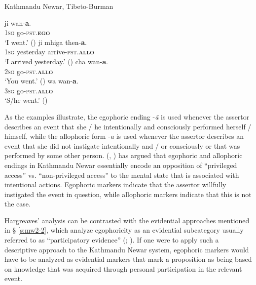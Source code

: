 \documentclass[output=paper]{langsci/langscibook}
\begin{document}
\begin{exe}
	\ex Kathmandu Newar, Tibeto-Burman\label{ex:mw1}
	\begin{xlist}
		\ex \label{ex:mw1a}
		\gll ji	wan-\textbf{ā}.\\
		1\textsc{sg} go-\textsc{pst}.\textbf{\textsc{ego}}\\
		\trans ‘I went.’ (\citealt[12]{Hargreaves2005})
		\ex \label{ex:mw1b}
		\gll ji	mhiga then-\textbf{a}.\\
		1\textsc{sg} yesterday arrive-\textsc{pst}.\textbf{\textsc{allo}}\\
		\trans ‘I arrived yesterday.’ (\citealt[13]{Hargreaves2005})
		\ex \label{ex:mw1c}
		\gll cha	 wan-\textbf{a}.\\
		2\textsc{sg} go-\textsc{pst}.\textbf{\textsc{allo}}\\
		\trans ‘You went.’ (\citealt[12]{Hargreaves2005})
		\ex \label{ex:mw1d}
		\gll wa	wan-\textbf{a}.\\
		3\textsc{sg} go-\textsc{pst}.\textbf{\textsc{allo}}\\
		\trans ‘S/he went.’ (\citealt[12]{Hargreaves2005})
	\end{xlist}
\end{exe}

As the examples illustrate, the egophoric ending -\textit{ā} is used whenever the assertor describes an event that she / he intentionally and consciously performed herself / himself, while the allophoric form -\textit{a} is used whenever the assertor describes an event that she did not instigate intentionally and / or consciously or that was performed by some other person. \citeauthor{Hargreaves1991} (\citeyear{Hargreaves1991}, \citeyear{Hargreaves2005}) has argued that egophoric and allophoric endings in Kathmandu Newar essentially encode an opposition of “privileged access” vs. “non-privileged access” to the mental state that is associated with intentional actions. Egophoric markers indicate that the assertor willfully instigated the event in question, while allophoric markers indicate that this is not the case.

Hargreaves’ analysis can be contrasted with the evidential approaches mentioned in § \ref{s:mw2-2}, which analyze egophoricity as an evidential subcategory usually referred to as “participatory evidence” (\citealt{Plungian2010}; \citealt{SanRoqueLoughnane2012}). If one were to apply such a descriptive approach to the Kathmandu Newar system, egophoric markers would have to be analyzed as evidential markers that mark a proposition as being based on knowledge that was acquired through personal participation in the relevant event.
\end{document}
